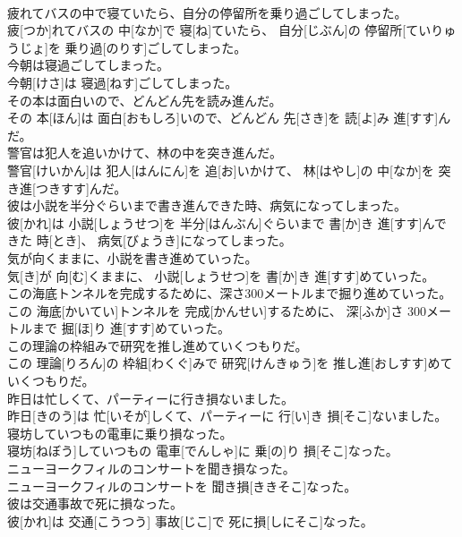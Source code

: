 \documentclass[8pt]{extreport}
\begin{document}
\begin{CJK}{UTF8}{min}
\\	疲れてバスの中で寝ていたら、自分の停留所を乗り過ごしてしまった。	
\\	疲[つか]れてバスの 中[なか]で 寝[ね]ていたら、 自分[じぶん]の 停留所[ていりゅうじょ]を 乗り過[のりす]ごしてしまった。
\\	今朝は寝過ごしてしまった。	
\\	今朝[けさ]は 寝過[ねす]ごしてしまった。
\\	その本は面白いので、どんどん先を読み進んだ。	
\\	その 本[ほん]は 面白[おもしろ]いので、どんどん 先[さき]を 読[よ]み 進[すす]んだ。
\\	警官は犯人を追いかけて、林の中を突き進んだ。	
\\	警官[けいかん]は 犯人[はんにん]を 追[お]いかけて、 林[はやし]の 中[なか]を 突き進[つきすす]んだ。
\\	彼は小説を半分ぐらいまで書き進んできた時、病気になってしまった。	
\\	彼[かれ]は 小説[しょうせつ]を 半分[はんぶん]ぐらいまで 書[か]き 進[すす]んできた 時[とき]、 病気[びょうき]になってしまった。
\\	気が向くままに、小説を書き進めていった。	
\\	気[き]が 向[む]くままに、 小説[しょうせつ]を 書[か]き 進[すす]めていった。
\\	この海底トンネルを完成するために、深さ300メートルまで掘り進めていった。	
\\	この 海底[かいてい]トンネルを 完成[かんせい]するために、 深[ふか]さ 300メートルまで 掘[ほ]り 進[すす]めていった。
\\	この理論の枠組みで研究を推し進めていくつもりだ。	
\\	この 理論[りろん]の 枠組[わくぐ]みで 研究[けんきゅう]を 推し進[おしすす]めていくつもりだ。
\\	昨日は忙しくて、パーティーに行き損ないました。	
\\	昨日[きのう]は 忙[いそが]しくて、パーティーに 行[い]き 損[そこ]ないました。
\\	寝坊していつもの電車に乗り損なった。	
\\	寝坊[ねぼう]していつもの 電車[でんしゃ]に 乗[の]り 損[そこ]なった。
\\	ニューヨークフィルのコンサートを聞き損なった。	
\\	ニューヨークフィルのコンサートを 聞き損[ききそこ]なった。
\\	彼は交通事故で死に損なった。	
\\	彼[かれ]は 交通[こうつう] 事故[じこ]で 死に損[しにそこ]なった。

\end{CJK}
\end{document}

